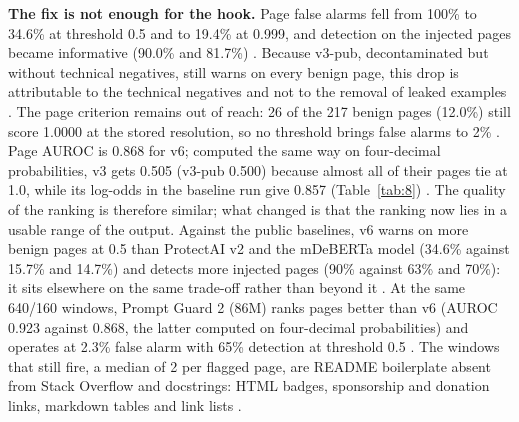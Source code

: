 \documentclass[11pt]{article}
\begin{document}
\textbf{The fix is not enough for the hook.} Page false alarms fell from 100\% to 34.6\% at threshold 0.5 and to 19.4\% at 0.999, and detection on the injected pages became informative (90.0\% and 81.7\%)%
. Because v3-pub, decontaminated but without technical negatives, still warns on every benign page, this drop is attributable to the technical negatives and not to the removal of leaked examples%
. The page criterion remains out of reach: 26 of the 217 benign pages (12.0\%) still score 1.0000 at the stored resolution, so no threshold brings false alarms to 2\%%
. Page AUROC is 0.868 for v6; computed the same way on four-decimal probabilities, v3 gets 0.505 (v3-pub 0.500) because almost all of their pages tie at 1.0, while its log-odds in the baseline run give 0.857 (Table~\ref{tab:8})%
. The quality of the ranking is therefore similar; what changed is that the ranking now lies in a usable range of the output. Against the public baselines, v6 warns on more benign pages at 0.5 than ProtectAI v2 and the mDeBERTa model (34.6\% against 15.7\% and 14.7\%) and detects more injected pages (90\% against 63\% and 70\%): it sits elsewhere on the same trade-off rather than beyond it%
. At the same 640/160 windows, Prompt Guard 2 (86M) ranks pages better than v6 (AUROC 0.923 against 0.868, the latter computed on four-decimal probabilities) and operates at 2.3\% false alarm with 65\% detection at threshold 0.5%
. The windows that still fire, a median of 2 per flagged page, are README boilerplate absent from Stack Overflow and docstrings: HTML badges, sponsorship and donation links, markdown tables and link lists%
.
\end{document}

